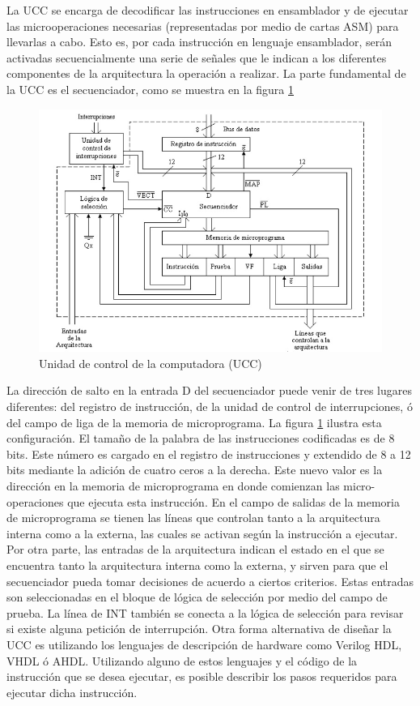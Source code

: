 \documentclass[12pt]{book}
\theoremstyle{definition}
\theoremstyle{remark}
\theoremstyle{plain}
\begin{document}
La UCC se encarga de decodificar las instrucciones en ensamblador y de ejecutar las microoperaciones
necesarias (representadas por medio de cartas ASM) para llevarlas a cabo. Esto es, por
cada instrucción en lenguaje ensamblador, serán activadas secuencialmente una serie de señales que
le indican a los diferentes componentes de la arquitectura la operación a realizar. La parte
fundamental de la UCC es el secuenciador, como se muestra en la figura \ref{fig30}

\begin{figure}
\centering
\includegraphics[width=5in]{UCC.jpg}
\caption{Unidad de control de la computadora (UCC)}
\label{fig30}
\end{figure}

La dirección de salto en la entrada D del secuenciador puede
venir de tres lugares diferentes: del registro de instrucción, de la unidad de control de interrupciones,
ó del campo de liga de la memoria de microprograma. La figura \ref{fig30} ilustra esta configuración.
El tamaño de la palabra de las instrucciones codificadas es de 8 bits. Este número es cargado en
el registro de instrucciones y extendido de 8 a 12 bits mediante la adición de cuatro ceros a la derecha. Este nuevo valor es la dirección en la memoria de microprograma en donde comienzan las
micro-operaciones que ejecuta esta instrucción.
En el campo de salidas de la memoria de microprograma se tienen las líneas que controlan tanto a
la arquitectura interna como a la externa, las cuales se activan según la instrucción a ejecutar.
Por otra parte, las entradas de la arquitectura indican el estado en el que se encuentra tanto la
arquitectura interna como la externa, y sirven para que el secuenciador pueda tomar decisiones de
acuerdo a ciertos criterios. Estas entradas son seleccionadas en el bloque de lógica de selección por
medio del campo de prueba. La línea de INT también se conecta a la lógica de selección para revisar
si existe alguna petición de interrupción.
Otra forma alternativa de diseñar la UCC es utilizando los lenguajes de descripción de hardware
como Verilog HDL, VHDL ó AHDL. Utilizando alguno de estos lenguajes y el código de la
instrucción que se desea ejecutar, es posible describir los pasos requeridos para ejecutar dicha
instrucción.
\end{document}
